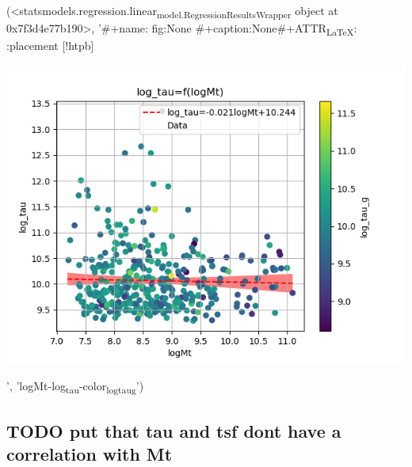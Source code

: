 \documentclass[a4paper,twocolumn]{article}
\begin{document}
(<statsmodels.regression.linear\textsubscript{model.RegressionResultsWrapper} object at 0x7f3d4e77b190>, '\#+name: fig:None \n\#+caption:None\n\#+ATTR\textsubscript{\LaTeX{}}: :placement [!htpb] \n\begin{center}
\includegraphics[width=.9\linewidth]{./figs/logMt-log_tau-color_log_tau_g.png}
\end{center}', 'logMt-log\textsubscript{tau}-color\textsubscript{log}\textsubscript{tau}\textsubscript{g}')

\subsection{{\bfseries\sffamily TODO} put that tau and tsf dont have a correlation with Mt}
\label{sec:org5dfe35c}

\pagebreak
\printbibliography
\end{document}
